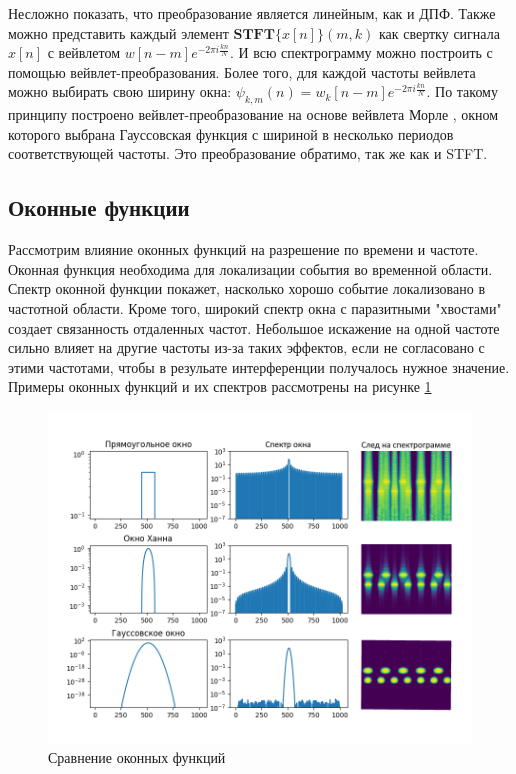 Несложно показать, что преобразование является линейным, как и ДПФ.
Также можно представить каждый элемент $\textbf{STFT}\{x[n]\} (m, k)$ как свертку сигнала $x[n]$ с вейвлетом $w[n - m] e^{-2\pi i  \frac{k n}{N}}$.
И всю спектрограмму можно построить с помощью вейвлет-преобразования. Более того, для каждой частоты вейвлета можно выбирать свою ширину окна: 
$\psi_{k,m}(n) = w_k[n - m] e^{-2\pi i  \frac{k n}{N}}$. По такому принципу построено вейвлет-преобразование на основе вейвлета Морле \cite{MorleWavelet}, 
окном которого выбрана Гауссовская функция с шириной в несколько периодов соответствующей частоты. Это преобразование обратимо, так же как и STFT.

\subsection{Оконные функции}

Рассмотрим влияние оконных функций на разрешение по времени и частоте. 
Оконная функция необходима для локализации события во временной области. 
Спектр оконной функции покажет, насколько хорошо событие локализовано в частотной области.
Кроме того, широкий спектр окна с паразитными "хвостами" создает связанность отдаленных частот. 
Небольшое искажение на одной частоте сильно влияет на другие частоты из-за таких эффектов, если не согласовано с этими частотами, 
чтобы в резульате интерференции получалось нужное значение. Примеры оконных функций и их спектров рассмотрены на рисунке \ref{fig:windows}

\begin{figure}
  \centering
  \includegraphics[width=16cm]{figures/windows}
  \caption{Сравнение оконных функций}
  \label{fig:windows}
\end{figure}

